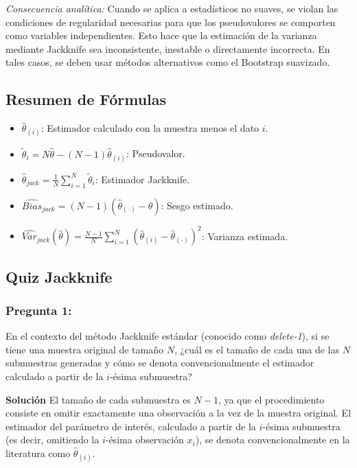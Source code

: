 \documentclass[a4paper]{article}
\begin{document}
\textit{Consecuencia analítica:} Cuando se aplica a estadísticos no suaves, se violan las condiciones de regularidad necesarias para que los pseudovalores se comporten como variables independientes. Esto hace que la estimación de la varianza mediante Jackknife sea inconsistente, inestable o directamente incorrecta. En tales casos, se deben usar métodos alternativos como el Bootstrap suavizado.

\subsection{Resumen de Fórmulas}
\begin{itemize}
    \item $\hat{\theta}_{(i)}$: Estimador calculado con la muestra menos el dato $i$.
    \item $\tilde{\theta}_i = N\hat{\theta} - (N-1)\hat{\theta}_{(i)}$: Pseudovalor.
    \item $\hat{\theta}_{jack} = \frac{1}{N} \sum_{i=1}^N \tilde{\theta}_i$: Estimador Jackknife.
    \item $\widehat{Bias}_{jack} = (N-1)(\hat{\theta}_{(\cdot)} - \hat{\theta})$: Sesgo estimado.
    \item $\widehat{Var}_{jack}(\hat{\theta}) = \frac{N-1}{N} \sum_{i=1}^N (\hat{\theta}_{(i)} - \hat{\theta}_{(\cdot)})^2$: Varianza estimada.
\end{itemize}


\newpage

\subsection{Quiz Jackknife}

\subsubsection{Pregunta 1:} En el contexto del método Jackknife estándar (conocido como \textit{delete-1}), si se tiene una muestra original de tamaño $N$, ¿cuál es el tamaño de cada una de las $N$ submuestras generadas y cómo se denota convencionalmente el estimador calculado a partir de la $i$-ésima submuestra?

\textbf{Solución}
El tamaño de cada submuestra es $N-1$, ya que el procedimiento consiste en omitir exactamente una observación a la vez de la muestra original. El estimador del parámetro de interés, calculado a partir de la $i$-ésima submuestra (es decir, omitiendo la $i$-ésima observación $x_i$), se denota convencionalmente en la literatura como $\hat{\theta}_{(i)}$.
\end{document}
